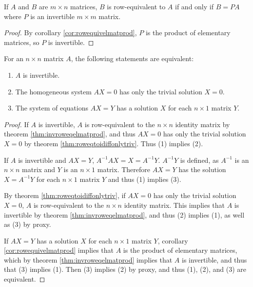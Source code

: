 \documentclass[12pt]{article}
\begin{document}
\begin{cor}
  If $A$ and $B$ are $m \times n$ matrices, $B$ is row-equivalent
  to $A$ if and only if $B = PA$ where $P$ is an invertible $m
  \times m$ matrix.

  \begin{proof}
    By corollary \ref{cor:rowequivelmatprod}, $P$ is the product
    of elementary matrices, so $P$ is invertible.
  \end{proof}
\end{cor}

\begin{thm} \label{thm:invonlytrivsoleveryequiv}
  For an $n \times n$ matrix $A$, the following statements are
  equivalent:

  \begin{enumerate}
    \item $A$ is invertible.
    \item The homogeneous system $AX = 0$ has only the trivial
      solution $X = 0$.
    \item The system of equations $AX = Y$ has a solution $X$ for
      each $n \times 1$ matrix $Y$.
  \end{enumerate}

  \begin{proof}
    If $A$ is invertible, $A$ is row-equivalent to the $n \times
    n$ identity matrix by theorem \ref{thm:invroweqelmatprod},
    and thus $AX = 0$ has only the trivial solution $X = 0$ by
    theorem \ref{thm:roweqtoidiffonlytriv}. Thus (1) implies (2).

    If $A$ is invertible and $AX = Y$, $A^{-1}AX = X = A^{-1}Y$.
    $A^{-1}Y$ is defined, as $A^{-1}$ is an $n \times n$ matrix
    and $Y$ is an $n \times 1$ matrix. Therefore $AX = Y$ has the
    solution $X = A^{-1}Y$ for each $n \times 1$ matrix $Y$ and
    thus (1) implies (3).

    By theorem \ref{thm:roweqtoidiffonlytriv}, if $AX = 0$ has
    only the trivial solution $X = 0$, $A$ is row-equivalent to
    the $n \times n$ identity matrix. This implies that $A$ is
    invertible by theorem \ref{thm:invroweqelmatprod}, and thus
    (2) implies (1), as well as (3) by proxy.

    If $AX = Y$ has a solution $X$ for each $n \times 1$ matrix
    $Y$, corollary \ref{cor:rowequivelmatprod} implies that $A$
    is the product of elementary matrices, which by theorem
    \ref{thm:invroweqelmatprod} implies that $A$ is invertible,
    and thus that (3) implies (1). Then (3) implies (2) by proxy,
    and thus (1), (2), and (3) are equivalent.
  \end{proof}
\end{thm}
\end{document}
